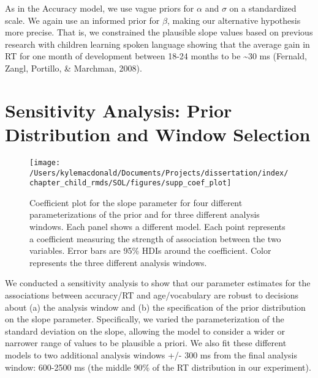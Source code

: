 \documentclass[oneside]{report}
\begin{document}
As in the Accuracy model, we use vague priors for \(\alpha\) and
\(\sigma\) on a standardized scale. We again use an informed prior for
\(\beta\), making our alternative hypothesis more precise. That is, we
constrained the plausible slope values based on previous research with
children learning spoken language showing that the average gain in RT
for one month of development between 18-24 months to be
\textasciitilde{}30 ms (Fernald, Zangl, Portillo, \& Marchman, 2008).

\section{Sensitivity Analysis: Prior Distribution and Window
Selection}\label{sensitivity-analysis-prior-distribution-and-window-selection}
\begin{figure}[!t]

{\centering \texttt{[image: /Users/kylemacdonald/Documents/Projects/dissertation/index/chapter\_child\_rmds/SOL/figures/supp\_coef\_plot]} 

}

\caption[Results of sensitivity analysis for Experiment 1.1.]{Coefficient plot for the slope parameter for four different parameterizations of the prior and for three different analysis windows. Each panel shows a different model. Each point represents a coefficient measuring the strength of association between the two variables. Error bars are 95\% HDIs around the coefficient. Color represents the three different analysis windows.}\label{fig:unnamed-chunk-10}
\end{figure}
We conducted a sensitivity analysis to show that our parameter estimates
for the associations between accuracy/RT and age/vocabulary are robust
to decisions about (a) the analysis window and (b) the specification of
the prior distribution on the slope parameter. Specifically, we varied
the parameterization of the standard deviation on the slope, allowing
the model to consider a wider or narrower range of values to be
plausible a priori. We also fit these different models to two additional
analysis windows +/- 300 ms from the final analysis window: 600-2500 ms
(the middle 90\% of the RT distribution in our experiment).
\end{document}
